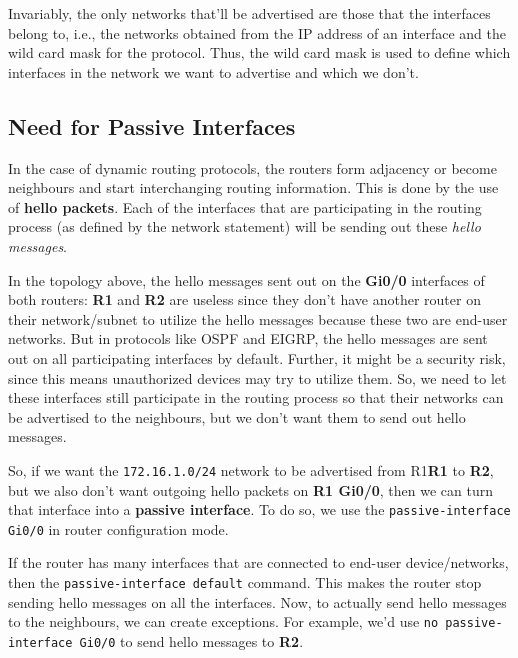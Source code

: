 \vspace{-5pt}
\noindent
Invariably, the only networks that'll be advertised are those that the interfaces belong to, i.e., the networks obtained from the IP address of an interface and the wild card mask for the protocol. Thus, the wild card mask is used to define which interfaces in the network we want to advertise and which we don't. 

\subsection{Need for Passive Interfaces}
In the case of dynamic routing protocols, the routers form adjacency or become neighbours and start interchanging routing information. This is done by the use of \textbf{hello packets}. Each of the interfaces that are participating in the routing process (as defined by the network statement) will be sending out these \textit{hello messages}. 

In the topology above, the hello messages sent out on the \textbf{Gi0/0} interfaces of both routers: \textbf{R1} and \textbf{R2} are useless since they don't have another router on their network/subnet to utilize the hello messages because these two are end-user networks. But in protocols like OSPF and EIGRP, the hello messages are sent out on all participating interfaces by default. Further, it might be a security risk, since this means unauthorized devices may try to utilize them. So, we need to let these interfaces still participate in the routing process so that their networks can be advertised to the neighbours, but we don't want them to send out hello messages. 

So, if we want the \verb|172.16.1.0/24| network to be advertised from R1\textbf{R1} to \textbf{R2}, but we also don't want outgoing hello packets on \textbf{R1 Gi0/0}, then we can turn that interface into a \textbf{passive interface}. To do so, we use the \verb|passive-interface Gi0/0| in router configuration mode. 

If the router has many interfaces that are connected to end-user device/networks, then the \verb|passive-interface default| command. This makes the router stop sending hello messages on all the interfaces. Now, to actually send hello messages to the neighbours, we can create exceptions. For example, we'd use \verb|no passive-interface Gi0/0| to send hello messages to \textbf{R2}. 